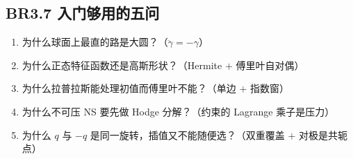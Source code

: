 \subsection{BR3.7 入门够用的五问}

\begin{enumerate}
  \item 为什么球面上最直的路是大圆？（$\ddot\gamma=-\gamma$）
  \item 为什么正态特征函数还是高斯形状？（Hermite $+$ 傅里叶自对偶）
  \item 为什么拉普拉斯能处理初值而傅里叶不能？（单边 $+$ 指数窗）
  \item 为什么不可压 NS 要先做 Hodge 分解？（约束的 Lagrange 乘子是压力）
  \item 为什么 $q$ 与 $-q$ 是同一旋转，插值又不能随便选？（双重覆盖 $+$ 对极是共轭点）
\end{enumerate}
